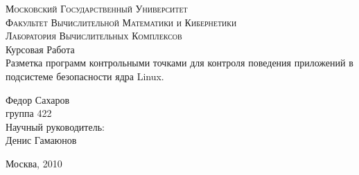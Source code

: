 \begin{titlepage}
	\begin{center}
	\textsc{\large{Московский Государственный Университет}
	\\[.5cm]
	\normalsize{Факультет Вычислительной Математики и Кибернетики\\
	Лаборатория Вычислительных Комплексов}}
	\\[4cm]

	\large{Курсовая Работа }\\[1.5cm]

	{\Large {Разметка программ контрольными точками для контроля
	поведения приложений в подсистеме безопасности ядра Linux.}} \\[3cm]
	\begin{flushright}
		Федор Сахаров\\
		группа 422\\
		
		Научный руководитель: \\ 
		Денис Гамаюнов
	\end{flushright}
	\vfill
	
	Москва, 2010
	\end{center}

\end{titlepage}

